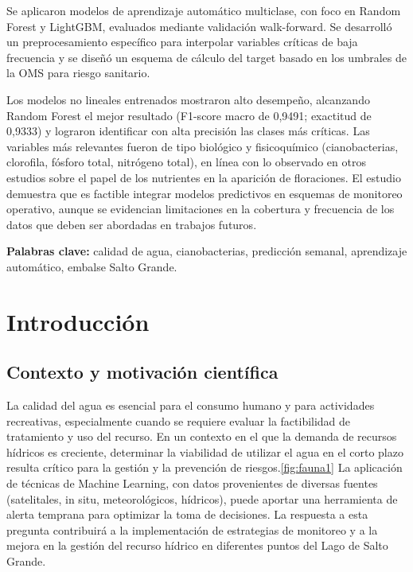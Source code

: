 \documentclass[11pt]{report}
\begin{document}
Se aplicaron modelos de aprendizaje automático multiclase, con foco en Random Forest y LightGBM, evaluados mediante validación walk-forward. Se desarrolló un preprocesamiento específico para interpolar variables críticas de baja frecuencia y se diseñó un esquema de cálculo del target basado en los umbrales de la OMS para riesgo sanitario.

Los modelos no lineales entrenados mostraron alto desempeño, alcanzando Random Forest el mejor resultado (F1-score macro de 0{,}9491; exactitud de 0{,}9333) y lograron identificar con alta precisión las clases más críticas. Las variables más relevantes fueron de tipo biológico y fisicoquímico (cianobacterias, clorofila, fósforo total, nitrógeno total), en línea con lo observado en otros estudios sobre el papel de los nutrientes en la aparición de floraciones. El estudio demuestra que es factible integrar modelos predictivos en esquemas de monitoreo operativo, aunque se evidencian limitaciones en la cobertura y frecuencia de los datos que deben ser abordadas en trabajos futuros.

\textbf{Palabras clave:} calidad de agua, cianobacterias, predicción semanal, aprendizaje automático, embalse Salto Grande.

\newpage






\chapter{Introducción}
\section{Contexto y motivación científica}

La calidad del agua es esencial para el consumo humano y para actividades recreativas, especialmente cuando se requiere evaluar la factibilidad de tratamiento y uso del recurso. En un contexto en el que la demanda de recursos hídricos es creciente, determinar la viabilidad de utilizar el agua en el corto plazo resulta crítico para la gestión y la prevención de riesgos.\ref{fig:fauna1} La aplicación de técnicas de Machine Learning, con datos provenientes de diversas fuentes (satelitales, in situ, meteorológicos, hídricos), puede aportar una herramienta de alerta temprana para optimizar la toma de decisiones. La respuesta a esta pregunta contribuirá a la implementación de estrategias de monitoreo y a la mejora en la gestión del recurso hídrico en diferentes puntos del Lago de Salto Grande.
\end{document}
